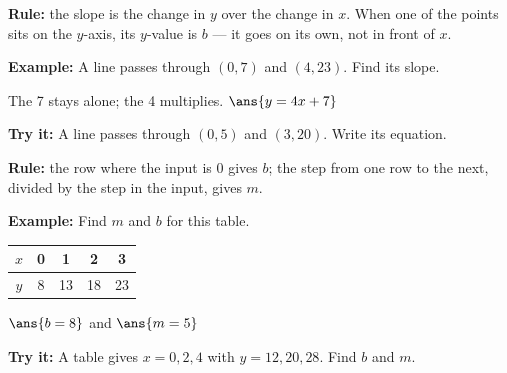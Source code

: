 \documentclass[12pt]{article}
\begin{document}

\begin{formulabox}
\textbf{Rule:} the slope is the change in $y$ over the change in $x$. When one
of the points sits on the $y$-axis, its $y$-value is $b$ --- it goes on its
own, not in front of $x$.
\end{formulabox}

\begin{examplebox}
\textbf{Example:} \quad A line passes through $(0, 7)$ and $(4, 23)$. Find its
slope.

The 7 stays alone; the 4 multiplies. \quad $\ans{y = 4x + 7}$
\end{examplebox}

\begin{tryitbox}
\textbf{Try it:} \quad A line passes through $(0, 5)$ and $(3, 20)$. Write its
equation.\\[2pt]
\end{tryitbox}


\begin{formulabox}
\textbf{Rule:} the row where the input is 0 gives $b$; the step from one row
to the next, divided by the step in the input, gives $m$.
\end{formulabox}

\begin{examplebox}
\textbf{Example:} \quad Find $m$ and $b$ for this table.
\begin{center}
\begin{tabular}{|c|c|c|c|c|}
\hline
$x$ & 0 & 1 & 2 & 3 \\ \hline
$y$ & 8 & 13 & 18 & 23 \\ \hline
\end{tabular}
\end{center}

$\ans{b = 8}$ \quad and \quad $\ans{m = 5}$
\end{examplebox}

\begin{tryitbox}
\textbf{Try it:} \quad A table gives $x = 0, 2, 4$ with $y = 12, 20, 28$. Find
$b$ and $m$.\\[2pt]
\end{tryitbox}
\end{document}
